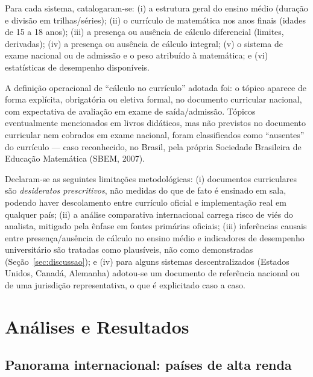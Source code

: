 \documentclass[12pt,a4paper,oneside]{article}
\begin{document}
Para cada sistema, catalogaram-se: (i) a estrutura geral do ensino médio
(duração e divisão em trilhas/séries); (ii) o currículo de matemática nos
anos finais (idades de 15 a 18 anos); (iii) a presença ou ausência de
cálculo diferencial (limites, derivadas); (iv) a presença ou ausência de
cálculo integral; (v) o sistema de exame nacional ou de admissão e o peso
atribuído à matemática; e (vi) estatísticas de desempenho disponíveis.

A definição operacional de ``cálculo no currículo'' adotada foi: o tópico
aparece de forma explícita, obrigatória ou eletiva formal, no documento
curricular nacional, com expectativa de avaliação em exame de
saída/admissão. Tópicos eventualmente mencionados em livros didáticos,
mas não previstos no documento curricular nem cobrados em exame nacional,
foram classificados como ``ausentes'' do currículo --- caso reconhecido,
no Brasil, pela própria Sociedade Brasileira de Educação Matemática
(SBEM, 2007).

Declaram-se as seguintes limitações metodológicas: (i) documentos
curriculares são \emph{desideratos prescritivos}, não medidas do que de
fato é ensinado em sala, podendo haver descolamento entre currículo
oficial e implementação real em qualquer país; (ii) a análise comparativa
internacional carrega risco de viés do analista, mitigado pela ênfase em
fontes primárias oficiais; (iii) inferências causais entre
presença/ausência de cálculo no ensino médio e indicadores de desempenho
universitário são tratadas como plausíveis, não como demonstradas
(Seção~\ref{sec:discussao}); e (iv) para alguns sistemas
descentralizados (Estados Unidos, Canadá, Alemanha) adotou-se um
documento de referência nacional ou de uma jurisdição representativa, o
que é explicitado caso a caso.

\section{Análises e Resultados}

\subsection{Panorama internacional: países de alta renda}
\end{document}
